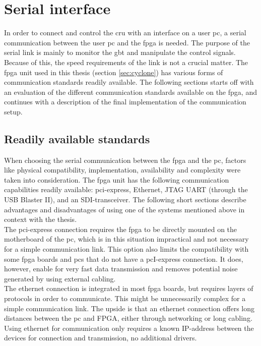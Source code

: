 \documentclass[main.tex]{subfiles}
\begin{document}
\chapter{Serial interface}

In order to connect and control the \gls{cru} with an interface on a user \gls{pc}, a serial communication between the user \gls{pc} and the \gls{fpga} is needed. The purpose of the serial link is mainly to monitor the \gls{gbt} and manipulate the control signals. Because of this, the speed requirements of the link is not a crucial matter. The \gls{fpga} unit used in this thesis (section \ref{sec:cyclone}) has various forms of communication standards readily available. The following sections starts off with an evaluation of the different communication standards available on the \gls{fpga}, and continues with a description of the final implementation of the communication setup.
\\

\section{Readily available standards}
When choosing the serial communication between the \gls{fpga} and the \gls{pc}, factors like physical compatibility, implementation, availability and complexity were taken into consideration. The \gls{fpga} unit has the following communication capabilities readily available: \gls{pci}-express, Ethernet, JTAG UART (through the USB Blaster II), and an SDI-transceiver. The following short sections describe advantages and disadvantages of using one of the systems mentioned above in context with the thesis.\\

The \gls{pci}-express connection requires the \gls{fpga} to be directly mounted on the motherboard of the \gls{pc}, which is in this situation impractical and not necessary for a simple communication link. This option also limits the compatibility with some \gls{fpga} boards and \gls{pc}s that do not have a \gls{pc}I-express connection. It does, however, enable for very fast data transmission and removes potential noise generated by using external cabling. \\

The ethernet connection is integrated in most \gls{fpga} boards, but requires layers of protocols in order to communicate. This might be unnecessarily complex for a simple communication link. The upside is that an ethernet connection offers long distances between the \gls{pc} and FPGA, either through networking or long cabling. Using ethernet for communication only requires a known IP-address between the devices for connection and transmission, no additional drivers. \\
\end{document}
